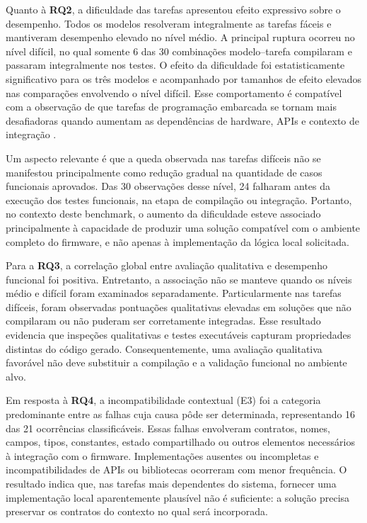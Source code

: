 \documentclass[12pt]{article}
\begin{document}
Quanto à \textbf{RQ2}, a dificuldade das tarefas apresentou efeito expressivo sobre o desempenho. Todos os modelos resolveram integralmente as tarefas fáceis e mantiveram desempenho elevado no nível médio. A principal ruptura ocorreu no nível difícil, no qual somente 6 das 30 combinações modelo--tarefa compilaram e passaram integralmente nos testes. O efeito da dificuldade foi estatisticamente significativo para os três modelos e acompanhado por tamanhos de efeito elevados nas comparações envolvendo o nível difícil. Esse comportamento é compatível com a observação de que tarefas de programação embarcada se tornam mais desafiadoras quando aumentam as dependências de hardware, APIs e contexto de integração \cite{babiuch2026benchmarking}.

Um aspecto relevante é que a queda observada nas tarefas difíceis não se manifestou principalmente como redução gradual na quantidade de casos funcionais aprovados. Das 30 observações desse nível, 24 falharam antes da execução dos testes funcionais, na etapa de compilação ou integração. Portanto, no contexto deste benchmark, o aumento da dificuldade esteve associado principalmente à capacidade de produzir uma solução compatível com o ambiente completo do firmware, e não apenas à implementação da lógica local solicitada.

Para a \textbf{RQ3}, a correlação global entre avaliação qualitativa e desempenho funcional foi positiva. Entretanto, a associação não se manteve quando os níveis médio e difícil foram examinados separadamente. Particularmente nas tarefas difíceis, foram observadas pontuações qualitativas elevadas em soluções que não compilaram ou não puderam ser corretamente integradas. Esse resultado evidencia que inspeções qualitativas e testes executáveis capturam propriedades distintas do código gerado. Consequentemente, uma avaliação qualitativa favorável não deve substituir a compilação e a validação funcional no ambiente alvo.

Em resposta à \textbf{RQ4}, a incompatibilidade contextual (E3) foi a categoria predominante entre as falhas cuja causa pôde ser determinada, representando 16 das 21 ocorrências classificáveis. Essas falhas envolveram contratos, nomes, campos, tipos, constantes, estado compartilhado ou outros elementos necessários à integração com o firmware. Implementações ausentes ou incompletas e incompatibilidades de APIs ou bibliotecas ocorreram com menor frequência. O resultado indica que, nas tarefas mais dependentes do sistema, fornecer uma implementação local aparentemente plausível não é suficiente: a solução precisa preservar os contratos do contexto no qual será incorporada.
\end{document}
